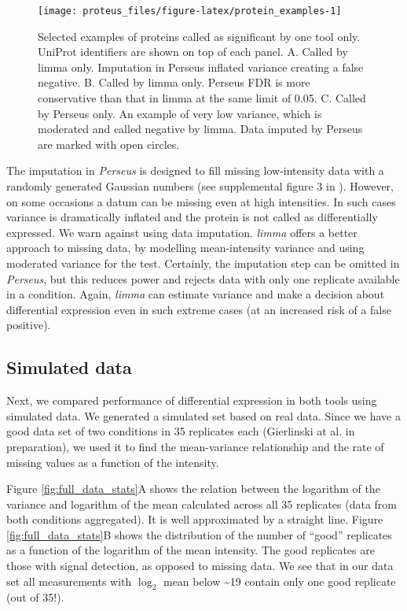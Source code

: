 \documentclass[]{article}
\begin{document}
\begin{figure}[H]

{\centering \texttt{[image: proteus\_files/figure-latex/protein\_examples-1]} 

}

\caption{\label{fig:protein_examples}Selected examples of proteins called as significant by one tool only. UniProt identifiers are shown on top of each panel. A. Called by limma only. Imputation in Perseus inflated variance creating a false negative. B. Called by limma only. Perseus FDR is more conservative than that in limma at the same limit of 0.05. C. Called by Perseus only. An example of very low variance, which is moderated and called negative by limma. Data imputed by Perseus are marked with open circles.}\label{fig:protein_examples}
\end{figure}

The imputation in \emph{Perseus} is designed to fill missing
low-intensity data with a randomly generated Gaussian numbers (see
supplemental figure 3 in \citet{tyanova2016}). However, on some
occasions a datum can be missing even at high intensities. In such cases
variance is dramatically inflated and the protein is not called as
differentially expressed. We warn against using data imputation.
\emph{limma} offers a better approach to missing data, by modelling
mean-intensity variance and using moderated variance for the test.
Certainly, the imputation step can be omitted in \emph{Perseus}, but
this reduces power and rejects data with only one replicate available in
a condition. Again, \emph{limma} can estimate variance and make a
decision about differential expression even in such extreme cases (at an
increased risk of a false positive).

\subsection{Simulated data}\label{simulated-data}

Next, we compared performance of differential expression in both tools
using simulated data. We generated a simulated set based on real data.
Since we have a good data set of two conditions in 35 replicates each
(Gierlinski at al. in preparation), we used it to find the mean-variance
relationship and the rate of missing values as a function of the
intensity.

Figure \ref{fig:full_data_stats}A shows the relation between the
logarithm of the variance and logarithm of the mean calculated across
all 35 replicates (data from both conditions aggregated). It is well
approximated by a straight line. Figure \ref{fig:full_data_stats}B shows
the distribution of the number of ``good'' replicates as a function of
the logarithm of the mean intensity. The good replicates are those with
signal detection, as opposed to missing data. We see that in our data
set all measurements with \(\log_2\) mean below \textasciitilde{}19
contain only one good replicate (out of 35!).
\end{document}
